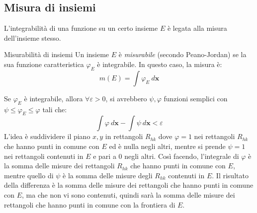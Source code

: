\documentclass[11pt, a4paper]{scrartcl}
\theoremstyle{definition}
\numberwithin{esempio}{section}
\theoremstyle{definition}
\numberwithin{obs}{section}
\numberwithin{nota}{section}
\numberwithin{equation}{subsection}
\begin{document}
\subsection{Misura di insiemi}
L'integrabilit\`a di una funzione su un certo insieme $E$ \`e legata alla misura dell'insieme stesso.
\begin{definizione}
	{Misurabilit\`a di insiemi}{}
	Un insieme $E$ \`e \textit{misurabile} (secondo Peano-Jordan) se la sua funzione caratteristica $\varphi _E$ \`e integrabile. In questo caso, la misura \`e:
	\begin{equation*}
		m(E) = \int \varphi _E \ d\mathbf{x} 
	\end{equation*}
\end{definizione}
\noindent Se $\varphi _E$ \`e integrabile, allora $\forall \varepsilon >0$, si avrebbero $\psi ,\varphi $ funzioni semplici con $\psi \le  \varphi _E \le \varphi $ tali che:
\[
\int \varphi  \ d\mathbf{x}  - \int \psi \ d\mathbf{x} < \varepsilon 
\] 
L'idea \`e suddividere il piano $x,y$ in rettangoli $R_{hk} $ dove $\varphi =1$ nei rettangoli $R_{hk} $ che hanno punti in comune con $E$ ed \`e nulla negli altri, mentre si prende $\psi =1 $ nei rettangoli contenuti in $E$ e pari a $0$ negli altri. Cos\`i facendo, l'integrale di $\varphi $ \`e la somma delle misure dei rettangoli $R_{hk}$ che hanno punti in comune con $E$, mentre quello di $\psi $ \`e la somma delle misure degli $R_{hk} $ contenuti in $E$. Il risultato della differenza \`e la somma delle misure dei rettangoli che hanno punti in comune con $E$, ma che non vi sono contenuti, quindi sar\`a la somma delle misure dei rettangoli che hanno punti in comune con la frontiera di $E$.
\end{document}
